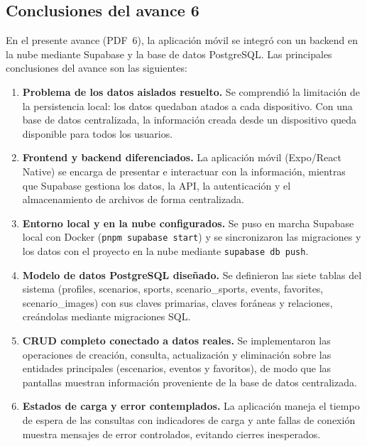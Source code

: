 \subsection*{Conclusiones del avance 6}

En el presente avance (PDF~6), la aplicaci\'on m\'ovil \nombreApp{} se
integr\'o con un backend en la nube mediante Supabase y la base de datos
PostgreSQL. Las principales conclusiones del avance son las siguientes:

\begin{enumerate}
  \item \textbf{Problema de los datos aislados resuelto.} Se comprendi\'o
    la limitaci\'on de la persistencia local: los datos quedaban atados a
    cada dispositivo. Con una base de datos centralizada, la informaci\'on
    creada desde un dispositivo queda disponible para todos los usuarios.

  \item \textbf{Frontend y backend diferenciados.} La aplicaci\'on m\'ovil
    (Expo/React Native) se encarga de presentar e interactuar con la
    informaci\'on, mientras que Supabase gestiona los datos, la API, la
    autenticaci\'on y el almacenamiento de archivos de forma centralizada.

  \item \textbf{Entorno local y en la nube configurados.} Se puso en
    marcha Supabase local con Docker (\texttt{pnpm supabase start}) y se
    sincronizaron las migraciones y los datos con el proyecto en la nube
    mediante \texttt{supabase db push}.

  \item \textbf{Modelo de datos PostgreSQL dise\~nado.} Se definieron las
    siete tablas del sistema (profiles, scenarios, sports,
    scenario\_sports, events, favorites, scenario\_images) con sus
    claves primarias, claves for\'aneas y relaciones, cre\'andolas
    mediante migraciones SQL.

  \item \textbf{CRUD completo conectado a datos reales.} Se implementaron
    las operaciones de creaci\'on, consulta, actualizaci\'on y eliminaci\'on
    sobre las entidades principales (escenarios, eventos y favoritos),
    de modo que las pantallas muestran informaci\'on proveniente de la
    base de datos centralizada.

  \item \textbf{Estados de carga y error contemplados.} La aplicaci\'on
    maneja el tiempo de espera de las consultas con indicadores de carga
    y ante fallas de conexi\'on muestra mensajes de error controlados,
    evitando cierres inesperados.


\end{enumerate}
